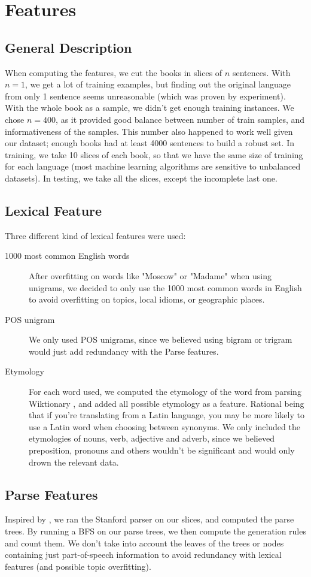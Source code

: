\documentclass[10pt]{article}
\begin{document}
\section{Features}
\subsection{General Description}
When computing the features, we cut the books in slices of $n$ sentences. With $n=1$, we get a lot of training examples, but finding out the original language from only 1 sentence seems unreasonable (which was proven by experiment). With the whole book as a sample, we didn't get enough training instances. We chose $n=400$, as it provided good balance between number of train samples, and informativeness of the samples. This number also happened to work well given our dataset; enough books had at least 4000 sentences to build a robust set. In training, we take 10 slices of each book, so that we have the same size of training for each language (most machine learning algorithms are sensitive to unbalanced datasets). In testing, we take all the slices, except the incomplete last one.
\subsection{Lexical Feature}
Three different kind of lexical features were used:
\begin{description}
\item[1000 most common English words] After overfitting on words like "Moscow" or "Madame" when using unigrams, we decided to only use the 1000 most common words in English to avoid overfitting on topics, local idioms, or geographic places.
\item[POS unigram] We only used POS unigrams, since we believed using bigram or trigram would just add redundancy with the Parse features.
\item[Etymology] For each word used, we computed the etymology of the word from parsing Wiktionary \cite{Wiktionary}, and added all possible etymology as a feature. Rational being that if you're translating from a Latin language, you may be more likely to use a Latin word when choosing between synonyms. We only included the etymologies of nouns, verb, adjective and adverb, since we believed preposition, pronouns  and others wouldn't be significant and would only drown the relevant data.
\end{description}

\subsection{Parse Features}
Inspired by \cite{Parse}, we ran the Stanford parser on our slices, and computed the parse trees. By running a BFS on our parse trees, we then compute the generation rules and count them. We don't take into account the leaves of the trees or nodes containing just part-of-speech information to avoid redundancy with lexical features (and possible topic overfitting).
\end{document}
